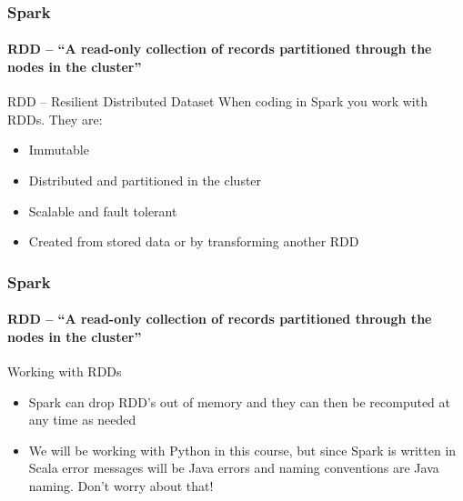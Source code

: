 \documentclass[aspectratio=169,dvipsnames]{beamer}
\begin{document}
        \begin{frame}
            \frametitle{Spark}
            \framesubtitle{RDD -- ``A read-only collection of records partitioned through the nodes in the cluster''}
            \begin{block}{RDD -- Resilient Distributed Dataset}
                When coding in Spark you work with RDDs. They are:
                \begin{itemize}
                    \item \alert{Immutable}
                    \item \alert{Distributed} and \alert{partitioned} in the cluster
                    \item \alert{Scalable} and \alert{fault tolerant}
                    \item Created from stored data or by transforming another RDD
                \end{itemize}
            \end{block}
        \end{frame}

        \begin{frame}
            \frametitle{Spark}
            \framesubtitle{RDD -- ``A read-only collection of records partitioned through the nodes in the cluster''}
            \begin{block}{Working with RDDs}
                \begin{itemize}
                    \item Spark can drop RDD's out of memory and they can then be \alert{recomputed at any time} as needed
                    \item We will be working with Python in this course, but
                    since Spark is written in Scala error messages will be \alert{Java
                    errors} and naming conventions are \alert{Java naming}. \alert{Don't worry about that!}
                \end{itemize}
            \end{block}
        \end{frame}
\end{document}

